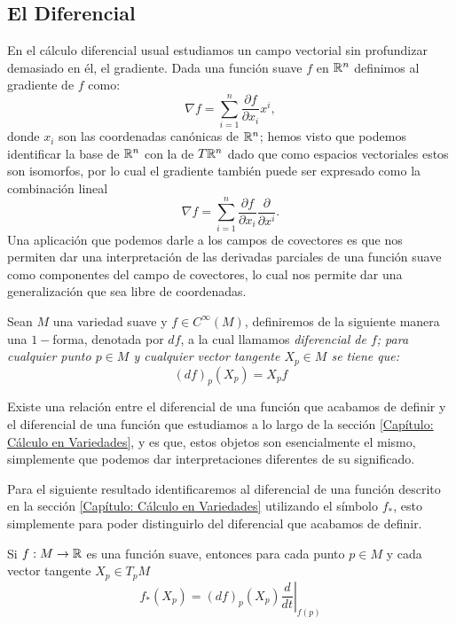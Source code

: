 \subsection{El Diferencial}\label{Subsección: El Diferencial}
En el cálculo diferencial usual estudiamos un campo vectorial sin profundizar demasiado en él, el gradiente. Dada una función suave $f$ en $\mathbb{R}^n$ definimos al gradiente de $f$ como:
\[
	\nabla f = \sum_{i=1}^{n} \frac{\partial f}{\partial x_i} x^i,
\]
donde $x_i$ son las coordenadas canónicas de $\mathbb{R}^n$; hemos visto que podemos identificar la base de $\mathbb{R}^n$ con la de $T\mathbb{R}^n$ dado que como espacios vectoriales estos son isomorfos, por lo cual el gradiente también puede ser expresado como la combinación lineal
\[
	\nabla f = \sum_{i=1}^{n} \frac{\partial f}{\partial x_i} \frac{\partial}{\partial x^i}.
\]
Una aplicación que podemos darle a los campos de covectores es que nos permiten dar una interpretación de las derivadas parciales de una función suave como componentes del campo de covectores, lo cual nos permite dar una generalización que sea libre de coordenadas.

\begin{definition}
	Sean $M$ una variedad suave y $f \in C^{\infty}(M)$, definiremos de la siguiente manera una $1-$forma, denotada por $df$, a la cual llamamos \it{diferencial de $f$}; para cualquier punto $p \in M$ y cualquier vector tangente $X_p \in M$ se tiene que:
	\[
		(df)_p(X_p) = X_p f
	\]
\end{definition}

Existe una relación entre el diferencial de una función que acabamos de definir y el diferencial de una función que estudiamos a lo largo de la sección \ref{Capítulo: Cálculo en Variedades}, y es que, estos objetos son esencialmente el mismo, simplemente que podemos dar interpretaciones diferentes de su significado.

Para el siguiente resultado identificaremos al diferencial de una función descrito en la sección \ref{Capítulo: Cálculo en Variedades} utilizando el símbolo $f_*$, esto simplemente para poder distinguirlo del diferencial que acabamos de definir.

\begin{theorem}
	Si $f: M \to \mathbb{R}$ es una función suave, entonces para cada punto $p \in M$ y cada vector tangente $X_p \in T_pM$
	\[
		f_*(X_p) = (df)_p (X_p) \left. \frac{d}{dt} \right|_{f(p)}
	\]
\end{theorem}

